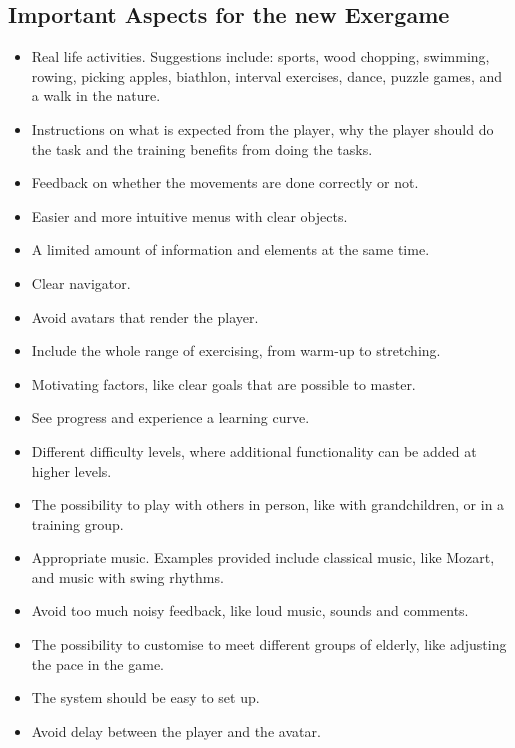 \subsection{Important Aspects for the new Exergame}
\begin{itemize}
\item Real life activities. Suggestions include: sports, wood chopping, swimming, rowing, picking apples, biathlon, interval exercises, dance, puzzle games, and a walk in the nature.
\item Instructions on what is expected from the player, why the player should do the task and the training benefits from doing the tasks.
\item Feedback on whether the movements are done correctly or not.
\item Easier and more intuitive menus with clear objects.
\item A limited amount of information and elements at the same time.
\item Clear navigator.
\item Avoid avatars that render the player.
\item Include the whole range of exercising, from warm-up to stretching.
\item Motivating factors, like clear goals that are possible to master.
\item See progress and experience a learning curve.
\item Different difficulty levels, where additional functionality can be added at higher levels.
\item The possibility to play with others in person, like with grandchildren, or in a training group.
\item Appropriate music. Examples provided include classical music, like Mozart, and music with swing rhythms.
\item Avoid too much noisy feedback, like loud music, sounds and comments.
\item The possibility to customise to meet different groups of elderly, like adjusting the pace in the game.
\item The system should be easy to set up.
\item Avoid delay between the player and the avatar.
\end{itemize}







